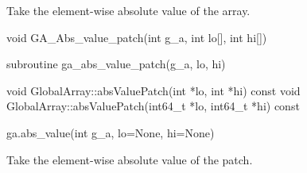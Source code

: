 \documentclass[10pt]{article}
\begin{document}
\gcoll

\begin{desc}
Take the element-wise absolute value of the array.
\end{desc}



\begin{capi}
\begin{ccode}
void GA_Abs_value_patch(int g_a, int lo[], int hi[])
\end{ccode}
\begin{funcargs}
\end{funcargs}
\end{capi}

\begin{fapi}
\begin{fcode}
subroutine ga_abs_value_patch(g_a, lo, hi)
\end{fcode}
\begin{funcargs}
\end{funcargs}
\end{fapi}

\begin{cxxapi}
\begin{cxxcode}
void GlobalArray::absValuePatch(int *lo, int *hi) const
void GlobalArray::absValuePatch(int64_t *lo, int64_t *hi) const
\end{cxxcode}
\begin{funcargs}
\end{funcargs}
\end{cxxapi}

\begin{pyapi}
\begin{pycode}
ga.abs_value(int g_a, lo=None, hi=None)
\end{pycode}
\begin{funcargs}
\end{funcargs}
\end{pyapi}

\gcoll

\begin{desc}
Take the element-wise absolute value of the patch.
\end{desc}
\end{document}
